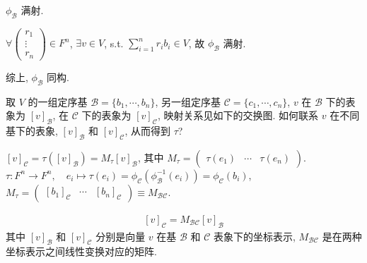 \documentclass{note}
\begin{document}
$\phi_{\mathcal{B}}$ 满射.
\begin{pf}
    $\forall\begin{pmatrix}
        r_1\\
        \vdots\\
        r_n
    \end{pmatrix}\in F^n$, $\exists v\in V$, s.t. $\sum_{i=1}^nr_ib_i\in V$, 故 $\phi_{\mathcal{B}}$ 满射.
\end{pf}

综上, $\phi_{\mathcal{B}}$ 同构.

取 $V$ 的一组定序基 $\mathcal{B}=\{b_1,\cdots,b_n\}$, 另一组定序基 $\mathcal{C}=\{c_1,\cdots,c_n\}$, $v$ 在 $\mathcal{B}$ 下的表象为 $[v]_{\mathcal{B}}$, 在 $\mathcal{C}$ 下的表象为 $[v]_{\mathcal{C}}$, 映射关系见如下的交换图. 如何联系 $v$ 在不同基下的表象, $[v]_{\mathcal{B}}$ 和 $[v]_{\mathcal{C}}$, 从而得到 $\tau$?
\begin{center}
\end{center}

$[v]_{\mathcal{C}}=\tau([v]_{\mathcal{B}})=M_{\tau}[v]_{\mathcal{B}}$, 其中 $M_{\tau}=\begin{pmatrix}
    \tau(e_1)&\cdots&\tau(e_n)
\end{pmatrix}$.\\
$\tau:F^n\rightarrow F^n,\quad e_i\mapsto\tau(e_i)=\phi_{\mathcal{C}}(\phi_{\mathcal{B}}^{-1}(e_i))=\phi_{\mathcal{C}}(b_i)$,\\
$M_{\tau}=\begin{pmatrix}
    [b_1]_{\mathcal{C}}&\cdots&[b_n]_{\mathcal{C}}
\end{pmatrix}\equiv M_{\mathcal{BC}}$.

\begin{thm}[(课本定理 2.12)]
    \begin{align*}
        \boxed{[v]_{\mathcal{C}}=M_{\mathcal{BC}}[v]_{\mathcal{B}}}
    \end{align*}
    其中 $[v]_{\mathcal{B}}$ 和 $[v]_{\mathcal{C}}$ 分别是向量 $v$ 在基 $\mathcal{B}$ 和 $\mathcal{C}$ 表象下的坐标表示, $M_{\mathcal{BC}}$ 是在两种坐标表示之间线性变换对应的矩阵.
\end{thm}
\end{document}
